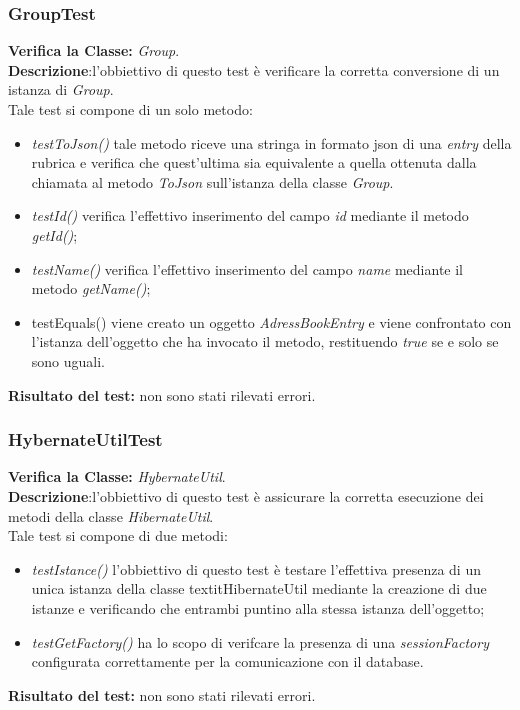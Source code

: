 \subsubsection{GroupTest}
\textbf{Verifica la Classe:} \textit{Group}.\\
\textbf{Descrizione}:l'obbiettivo di questo test è verificare la corretta conversione di un istanza di \textit{Group}.\\
Tale test si compone di un solo metodo:
\begin{itemize}
\item \textit{testToJson() } tale metodo riceve una stringa in formato json di una 	\textit{entry} della rubrica e verifica che quest'ultima sia equivalente a quella ottenuta dalla chiamata al metodo \textit{ToJson} sull'istanza della classe \textit{Group}.
\item \textit{testId() } verifica l'effettivo inserimento del campo \textit{id} mediante il metodo \textit{getId()};
\item \textit{testName() } verifica l'effettivo inserimento del campo \textit{name} mediante il metodo \textit{getName()};
\item{testEquals()} viene creato un oggetto \textit{AdressBookEntry} e viene confrontato con l'istanza dell'oggetto che ha invocato il metodo, restituendo \textit{true} se e solo se sono uguali.
\end{itemize}
\textbf{Risultato del test:} non sono stati rilevati errori.

\subsubsection{HybernateUtilTest}
\textbf{Verifica la Classe:} \textit{HybernateUtil}.\\
\textbf{Descrizione}:l'obbiettivo di questo test è assicurare la corretta esecuzione dei metodi della classe \textit{HibernateUtil}. \\
Tale test si compone di due metodi:
\begin{itemize}
\item \textit{testIstance() } l'obbiettivo di questo test è testare l'effettiva presenza di un unica istanza della classe textit{HibernateUtil} mediante la creazione di due istanze e verificando che entrambi puntino alla stessa istanza dell'oggetto;
\item \textit{testGetFactory()} ha lo scopo di verifcare la presenza di una \textit{sessionFactory} configurata correttamente per la comunicazione con il database.
\end{itemize}
\textbf{Risultato del test:} non sono stati rilevati errori.

